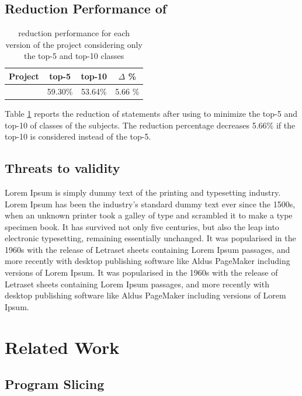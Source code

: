 \documentclass{article}
\begin{document}
\subsection{Reduction Performance of \ds{}}

\begin{table}[h]
	\centering
	\setlength{\tabcolsep}{4pt}
	\begin{tabular}{cccc}
		\toprule
		Project             &  top-5  & top-10 & $\Delta$ \%\\ 
		\midrule
		\chart{}  & 59.30\% & 53.64\% & 5.66 \%\\ 		
		\bottomrule
	\end{tabular}
	\caption {\ds{} reduction performance for each version of the \chart{} project considering only the top-5 and top-10 classes}
	\label{tab:red}
\end{table}
\normalsize

Table \ref{tab:red} reports the reduction of statements after using \ds{} to minimize the top-5 and top-10 of classes of the subjects. The reduction percentage decreases 5.66\% if the top-10 is considered instead of the top-5. 



\subsection{Threats to validity}

 Lorem Ipsum is simply dummy text of the printing and typesetting industry. Lorem Ipsum has been the industry's standard dummy text ever since the 1500s, when an unknown printer took a galley of type and scrambled it to make a type specimen book. It has survived not only five centuries, but also the leap into electronic typesetting, remaining essentially unchanged. It was popularised in the 1960s with the release of Letraset sheets containing Lorem Ipsum passages, and more recently with desktop publishing software like Aldus PageMaker including versions of Lorem Ipsum. It was popularised in the 1960s with the release of Letraset sheets containing Lorem Ipsum passages, and more recently with desktop publishing software like Aldus PageMaker including versions of Lorem Ipsum.

\section{Related Work}

\subsection{Program Slicing}
\end{document}
